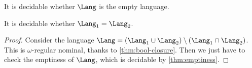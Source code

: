 
\begin{theorem}
It is decidable whether $\Lang$ is the empty language.
\label{thm:emptiness}
\end{theorem}

\begin{theorem}
It is decidable whether $\Lang_1 = \Lang_2$.
\end{theorem}

\begin{proof}
Consider the language $\Lang = (\Lang_1 \cup \Lang_2) \setminus (\Lang_1 \cap \Lang_2 )$. This is $\omega$-regular nominal, thanks to \cref{thm:bool-closure}. Then we just have to check the emptiness of $\Lang$, which is decidable by \cref{thm:emptiness}.
\end{proof}